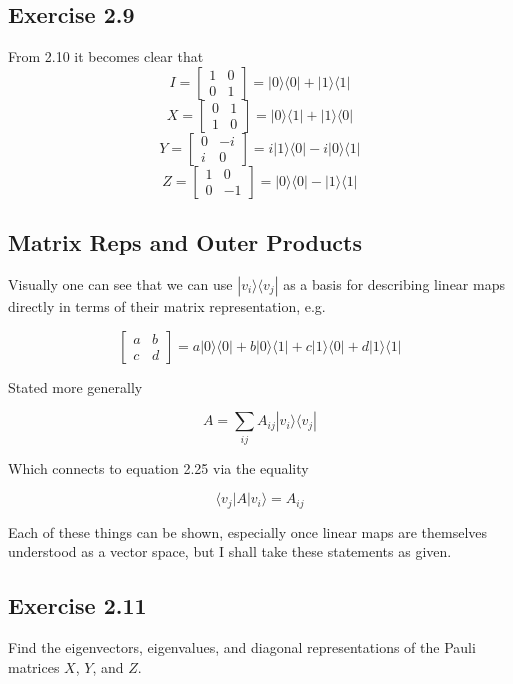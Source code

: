 \documentclass[]{article}
\newcommand{\bra}[1]{\langle #1 |}
\newcommand{\ket}[1]{| #1 \rangle}
\begin{document}
\subsection{Exercise 2.9}

From 2.10 it becomes clear that
\[
I = \left[\begin{matrix}
1 & 0 \\
0 & 1
\end{matrix}\right] = \ket{0}\bra{0} + \ket{1}\bra{1}
\]
\[
X = \left[\begin{matrix}
0 & 1 \\
1 & 0
\end{matrix}\right] = \ket{0}\bra{1} + \ket{1}\bra{0}
\]
\[
Y = \left[\begin{matrix}
0 & -i \\
i & 0
\end{matrix}\right] = i\ket{1}\bra{0} -i\ket{0}\bra{1}
\]
\[
Z = \left[\begin{matrix}
1 & 0 \\
0 & -1
\end{matrix}\right] = \ket{0}\bra{0} - \ket{1}\bra{1}
\]

\subsection{Matrix Reps and Outer Products}

Visually one can see that we can use $\ket{v_i} \bra{v_j}$ as a basis for describing linear maps directly in terms of their matrix representation, e.g.

\[\left[\begin{matrix}a&b\\c&d\end{matrix}\right] = a\ket{0}\bra{0} +
	b\ket{0}\bra{1} + c\ket{1}\bra{0} + d\ket{1}\bra{1}\]

Stated more generally

\[A = \sum_{ij} A_{ij}\ket{v_i}\bra{v_j}\]

Which connects to equation 2.25 via the equality

\[\bra{v_j} A \ket{ v_i} = A_{ij}\]

Each of these things can be shown, especially once linear maps are themselves understood as a vector space, but I shall take these statements as given.

\subsection{Exercise 2.11}
Find the eigenvectors, eigenvalues, and diagonal representations of the Pauli matrices $X$, $Y$, and $Z$.
\end{document}
